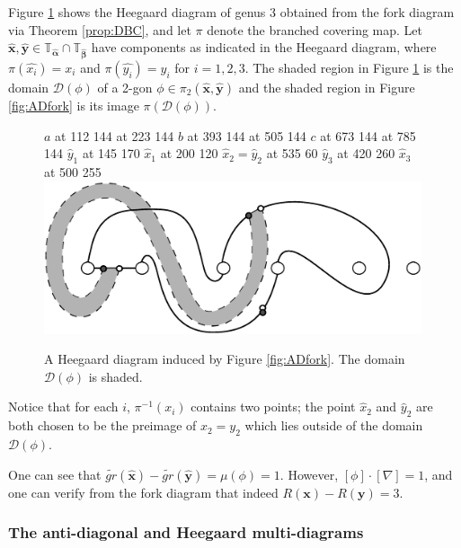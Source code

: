 \documentclass[11pt]{article}
\theoremstyle{plain} \newtheorem{thm}{Theorem}[subsection]
\theoremstyle{plain} \newtheorem{cor}[thm]{Corollary}
\theoremstyle{plain} \newtheorem{prop}[thm]{Proposition}
\theoremstyle{plain} \newtheorem{conj}[thm]{Conjecture}
\theoremstyle{plain} \newtheorem{lem}[thm]{Lemma}
\theoremstyle{definition} \newtheorem{df}[thm]{Definition}
\theoremstyle{remark} \newtheorem{rmk}[thm]{Remark}
\theoremstyle{remark} \newtheorem{obs}[thm]{Observation}
\newcommand{\tld}[1]{\widetilde{#1}}
\newcommand{\ba}{\boldsymbol{\alpha}}
\newcommand{\bb}{\boldsymbol{\beta}}
\newcommand{\bah}{\widehat{\ba}}
\newcommand{\bbh}{\widehat{\bb}}
\newcommand{\Tah}{\mathbb{T}_{\bah}}
\newcommand{\Tbh}{\mathbb{T}_{\bbh}}
\newcommand{\bx}{\mathbf{x}}
\newcommand{\by}{\mathbf{y}}
\newcommand{\bxh}{\widehat{\mathbf{x}}}
\newcommand{\byh}{\widehat{\mathbf{y}}}
\newcommand{\AD}{\nabla}
\begin{document}
Figure \ref{fig:ADHD} shows the Heegaard diagram of genus 3 obtained from the fork diagram via Theorem \ref{prop:DBC}, and let $\pi$ denote the branched covering map.  Let $\bxh, \byh \in \Tah \cap \Tbh$ have components as indicated in the Heegaard diagram, where $\pi(\widehat{x_{i}}) = x_{i}$ and $\pi(\widehat{y_{i}}) = y_{i}$ for $i = 1, 2, 3$.  The shaded region in Figure \ref{fig:ADHD} is the domain $\mathcal{D}(\phi)$ of a 2-gon $\phi \in \pi_{2}(\bxh, \byh)$ and the shaded region in Figure \ref{fig:ADfork} is its image $\pi(\mathcal{D}(\phi))$.

\begin{figure}[h!]
\centering
{} 
\small
\pinlabel* $a$ at 112 144
\pinlabel* {} at 223 144
\pinlabel* $b$ at 393 144
\pinlabel* {} at 505 144
\pinlabel* $c$ at 673 144
\pinlabel* {} at 785 144
\pinlabel* $\widehat{y}_{1}$ at 145 170
\pinlabel* $\widehat{x}_{1}$ at 200 120
\pinlabel* $\widehat{x}_{2}=\widehat{y}_{2}$ at  535 60
\pinlabel* $\widehat{y}_{3}$ at 420 260
\pinlabel* $\widehat{x}_{3}$ at 500 255
\endlabellist 
\includegraphics[height = 45mm]{ADHD}
\caption[A Heegaard diagram depicting non-trivial intersection with $\AD$]{A Heegaard diagram induced by Figure \ref{fig:ADfork}.  The domain $\mathcal{D}(\phi)$ is shaded.\label{fig:ADHD}}
\end{figure}

Notice that for each $i$, $\pi^{-1}(x_{i})$ contains two points; the point $\widehat{x}_{2}$ and $\widehat{y}_{2}$ are both chosen to be the preimage of $x_{2} = y_{2}$ which lies outside of the domain $\mathcal{D}(\phi)$.

One can see that $\tld{gr}(\bxh) - \tld{gr}(\byh) = \mu(\phi) = 1$.  However, $[\phi]\cdot[\AD] = 1$, and one can verify from the fork diagram that indeed $R(\bx) - R(\by) = 3.$

\subsubsection{The anti-diagonal and Heegaard multi-diagrams}\label{sec:multiad}
\end{document}

